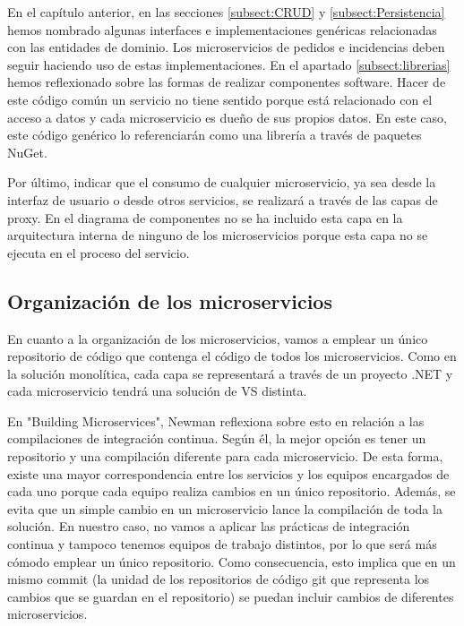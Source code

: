 \documentclass[11pt,spanish,listoffigures]{tfgetsinf}
\begin{document}
En el capítulo anterior, en las secciones \ref{subsect:CRUD}  y \ref{subsect:Persistencia}  hemos nombrado algunas interfaces e implementaciones genéricas relacionadas con las entidades de dominio. Los microservicios de pedidos e incidencias deben seguir haciendo uso de estas implementaciones. En el apartado \ref{subsect:librerias}  hemos reflexionado sobre las formas de realizar componentes software. Hacer de este código común un servicio no tiene sentido porque está relacionado con el acceso a datos y cada microservicio es dueño de sus propios datos. En este caso, este código genérico lo referenciarán como una librería a través de paquetes NuGet.

Por último, indicar que el consumo de cualquier microservicio, ya sea desde la interfaz de usuario o desde otros servicios, se realizará a través de las capas de proxy. En el diagrama de componentes no se ha incluido esta capa en la arquitectura interna de ninguno de los microservicios porque esta capa no se ejecuta en el proceso del servicio.

\subsection{Organización de los microservicios}

En cuanto a la organización de los microservicios, vamos a emplear un único repositorio de código que contenga el código de todos los microservicios. Como en la solución monolítica, cada capa se representará a través de un proyecto .NET y cada microservicio tendrá una solución de VS distinta.

En "Building Microservices", Newman reflexiona sobre esto en relación a las compilaciones de integración continua. Según él, la mejor opción es tener un repositorio y una compilación diferente para cada microservicio. De esta forma, existe una mayor correspondencia entre los servicios y los equipos encargados de cada uno porque cada equipo realiza cambios en un único repositorio. Además, se evita que un simple cambio en un microservicio lance la compilación de toda la solución. \cite{Newman2013a} En nuestro caso, no vamos a aplicar las prácticas de integración continua y tampoco tenemos equipos de trabajo distintos, por lo que será más cómodo emplear un único repositorio. Como consecuencia, esto implica que en un mismo commit (la unidad de los repositorios de código git que representa los cambios que se guardan en el repositorio) se puedan incluir cambios de diferentes microservicios.
\end{document}
